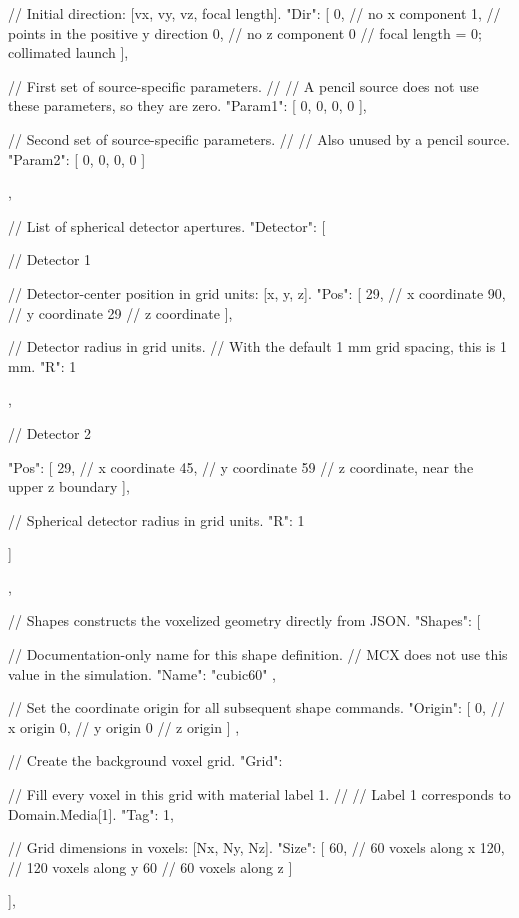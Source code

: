 {{{      // Initial direction: [vx, vy, vz, focal length].
      "Dir": [
        0, // no x component
        1, // points in the positive y direction
        0, // no z component
        0  // focal length = 0; collimated launch
      ],

      // First set of source-specific parameters.
      //
      // A pencil source does not use these parameters, so they are zero.
      "Param1": [
        0,
        0,
        0,
        0
      ],

      // Second set of source-specific parameters.
      //
      // Also unused by a pencil source.
      "Param2": [
        0,
        0,
        0,
        0
      ]
    },

    // List of spherical detector apertures.
    "Detector": [

      // Detector 1
      {
        // Detector-center position in grid units: [x, y, z].
        "Pos": [
          29, // x coordinate
          90, // y coordinate
          29  // z coordinate
        ],

        // Detector radius in grid units.
        // With the default 1 mm grid spacing, this is 1 mm.
        "R": 1
      },

      // Detector 2
      {
        "Pos": [
          29, // x coordinate
          45, // y coordinate
          59  // z coordinate, near the upper z boundary
        ],

        // Spherical detector radius in grid units.
        "R": 1
      }
    ]
  },

  // Shapes constructs the voxelized geometry directly from JSON.
  "Shapes": [

    {
      // Documentation-only name for this shape definition.
      // MCX does not use this value in the simulation.
      "Name": "cubic60"
    },

    {
      // Set the coordinate origin for all subsequent shape commands.
      "Origin": [
        0, // x origin
        0, // y origin
        0  // z origin
      ]
    },

    {
      // Create the background voxel grid.
      "Grid": {

        // Fill every voxel in this grid with material label 1.
        //
        // Label 1 corresponds to Domain.Media[1].
        "Tag": 1,

        // Grid dimensions in voxels: [Nx, Ny, Nz].
        "Size": [
          60,  // 60 voxels along x
          120, // 120 voxels along y
          60   // 60 voxels along z
        ]
      }
    }
  ],

}
